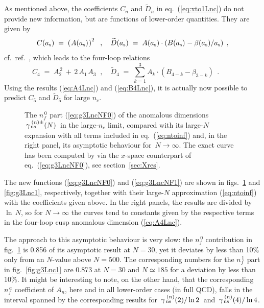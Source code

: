 \documentclass[12pt]{article}
\newcommand{\beq}{\begin{equation}}
\newcommand{\eeq}{\end{equation}}
\newcommand{\ars}{a_{\rm s}}
\def\nc{{n_c}}
\def\nfz{{n^{\,0}_{\! f}}}
\def\nfo{{n^{\,1}_{\! f}}}
\begin{document}
As mentioned above, the coefficients $C_n$ and $\widetilde{D}_n$ in 
eq.~(\ref{eq:xto1Lnc}) do not provide new information, but are functions of
lower-order quantities. They are given by 
%
\beq
\label{eq:CDofAB}
  C(\ars) \;=\; \left( \:\! A(\ars) \:\! \right)^{2^{}}
\;\; , \quad
  \widetilde{D}(\ars) \;=\; A(\ars) \cdot ( B(\ars)_{} - \beta(\ars)/\ars )
\:\: ,
\eeq
%
cf.~ref.~\cite{Dokshitzer:2005bf}, which leads to the four-loop relations
%
\beq
\label{eq:CD4ofAB}
  C_4 \;=\; A_2^{\,2^{}} \,+\, 2\,A_{1\,} A_3 
\;\; , \quad
  \widetilde{D}_4 \;=\; \sum_{k=1}^{3} A_k \cdot ( B_{4-k} - \beta_{3-k} ) 
\:\: . \qquad
\eeq
%
Using the results (\ref{eq:A4Lnc}) and (\ref{eq:B4Lnc}), it is actually now 
possible to predict $C_5$ and $\widetilde{D}_5$ for large $\nc$.

\pagebreak

\begin{figure}[htb]
\vspace{-1mm}
\centerline{}
\vspace{-1mm}
\caption{ \label{fig:g3Lnc0} \small
 The $\nfz$ part (\ref{eq:g3LncNF0}) of the anomalous dimensions 
 $\,\gamma_{\,\rm ns}^{\:(n)\pm}(N)\,$ in the large-$\nc$ limit, compared with 
 its large-$N$ expansion with all terms included in eq.~(\ref{eq:ntoinf}) 
 and, in the right panel, its asymptotic behaviour for $\,N \to \infty$. 
 The exact curve has been computed by via the $x$-space counterpart of 
 eq.~(\ref{eq:g3LncNF0}), see section~\ref{sec:Xres}.
 }
\vspace{1mm}
\end{figure}
 
The new functions (\ref{eq:g3LncNF0}) and (\ref{eq:g3LncNF1}) are shown in 
figs.~\ref{fig:g3Lnc0} and \ref{fig:g3Lnc1}, respectively, together with their 
large-$N$ approximation (\ref{eq:ntoinf}) with the coefficients given above.
In the right panels, the results are divided by $\ln\, N$, so for 
$N \to \infty$ the curves tend to constants given by the respective terms in 
the four-loop cusp anomalous dimension (\ref{eq:A4Lnc}).
 
The approach to this asymptotic behaviour is very slow: the $\nfz$ contribution
in fig.~\ref{fig:g3Lnc0} is 0.856 of its asymptotic result at $N=30$, yet it 
deviates by less than 10\% only from an $N$-value above $N = 500$. 
The corresponding numbers for the $\nfo$ part in fig.~\ref{fig:g3Lnc1} are
0.873 at $N=30$ and $N \simeq 185$ for a deviation by less than 10\%.
%
It might be interesting to note, on the other hand, that the corresponding
$n_{\!f}^{\,a}$ coefficient of $A_n$, here and in all lower-order cases
(in full QCD), falls in the interval spanned by the corresponding results 
for $\,\gamma_{\,\rm ns}^{\:(n)}(2) / \ln 2\,$ and 
$\,\gamma_{\,\rm ns}^{\:(n)}(4) / \ln 4$.
\end{document}
